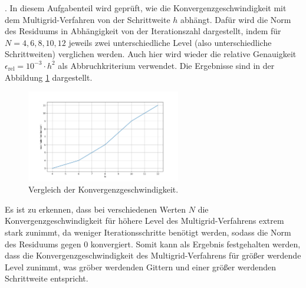 \documentclass[11pt,a4paper]{article}
\begin{document}
. In diesem Aufgabenteil wird geprüft, wie die Konvergenzgeschwindigkeit mit dem Multigrid-Verfahren von der Schrittweite $h$ abhängt. Dafür wird die Norm des Residuums in Abhängigkeit von der Iterationszahl dargestellt, indem für $N = 4,6,8,10,12$
jeweils zwei unterschiedliche Level (also unterschiedliche Schrittweiten) verglichen werden. Auch hier wird wieder die relative Genauigkeit $\epsilon_{\mathrm{rel}} = 10^{-3} \cdot h^2$ als Abbruchkriterium verwendet. Die Ergebnisse sind in der Abbildung
\ref{fig:h2_last_plot} dargestellt.
\begin{figure}[htbp]
    \centering
    \includegraphics[width=0.6\textwidth,scale=0.7]{h2_last_plot}
    \caption[Vergleich der Konvergenzgeschwindigkeit.]{Vergleich der Konvergenzgeschwindigkeit.}\label{fig:h2_last_plot}
\end{figure} Es ist zu erkennen, dass bei verschiedenen Werten $N$ die Konvergenzgeschwindigkeit für höhere Level des Multigrid-Verfahrens extrem stark zunimmt, da weniger Iterationsschritte benötigt werden, sodass die Norm des Residuums
gegen $0$ konvergiert. Somit kann als Ergebnis festgehalten werden, dass die Konvergenzgeschwindigkeit des Multigrid-Verfahrens für größer werdende Level zunimmt, was gröber werdenden Gittern und einer größer werdenden Schrittweite entspricht.

\newpage

\listoffigures
\end{document}
